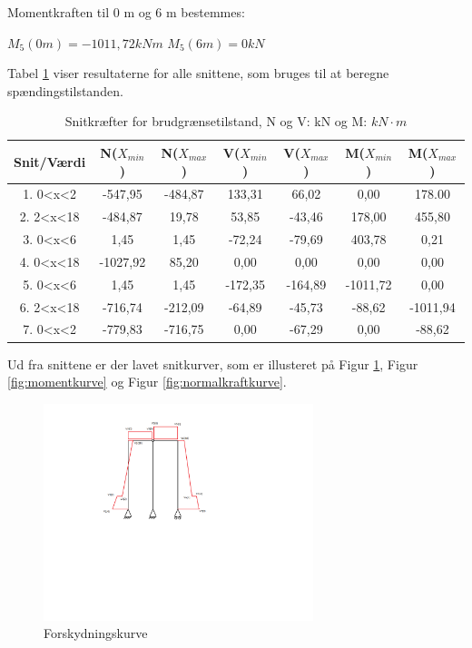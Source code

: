 Momentkraften til 0 m og 6 m bestemmes:
\begin{center}
	$M_5(0m) = -1011,\!72 kNm$
	\newline
	$M_5(6m) = 0 kN$
\end{center}

Tabel \ref{tab:resultaterbrud} viser resultaterne for alle snittene, som bruges til at beregne spændingstilstanden. 

\begin{table}
	\begin{center}
		\begin{tabular}{|c|c|c|c|c|c|c|}
			\hline
			Snit/Værdi & N($X_{min}$) & N($X_{max}$) & V($X_{min}$) & V($X_{max}$) & M($X_{min}$) & M($X_{max}$) 	\\ \hline
			1. 0<x<2  & -547,95       & -484,87    	&  133,31    	&  66,02 	&  0,00     &  178.00        		\\ \hline
			2. 2<x<18 &  -484,87        &  19,78       &  53,85      & -43,46   &  178,00  &  455,80    \\ \hline
			3. 0<x<6  & 1,45       &  1,45     &  -72,24         &  -79,69     &  403,78     &  0,21 			    \\ \hline
			4. 0<x<18 &  -1027,92       &  85,20      &  0,00        &  0,00    &  0,00   &   0,00    \\ \hline
			5. 0<x<6  &  1,45     &    1,45      &  -172,35      &  -164,89     &   -1011,72        &   0,00      		\\ \hline
			6. 2<x<18 &  -716,74  &   -212,09  &   -64,89    &   -45,73    &    -88,62       &   -1011,94      		\\ \hline
			7. 0<x<2 &  -779,83        &   -716,75       &     0,00      &   -67,29   &    0,00     &    -88,62     		\\ \hline
		\end{tabular}
		\caption{Snitkræfter for brudgrænsetilstand, N og V: kN og M: $kN\cdot m$}
		\label{tab:resultaterbrud}
	\end{center}
\end{table}

Ud fra snittene er der lavet snitkurver, som er illusteret på Figur \ref{fig:forskydningskurve}, Figur \ref{fig:momentkurve} og Figur \ref{fig:normalkraftkurve}. 

\begin{figure}[H]
	\centering
	\includegraphics[width=0.7\textwidth]{billeder/sk.png}
	\caption{Forskydningskurve}
	\label{fig:forskydningskurve}
\end{figure}

